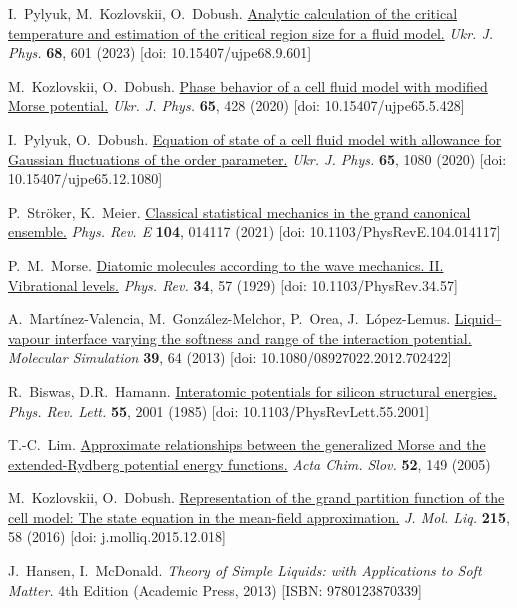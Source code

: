 \documentclass[fleqn,twoside,twocolumn,nofootinbib,showkeys]{revtex4} %
\begin{document}
\begin{thebibliography}{9}
		 I.~Pylyuk, M.~Kozlovskii, O.~Dobush.
		\href{https://ujp.bitp.kiev.ua/index.php/ujp/article/view/2023197}{Analytic calculation of the critical temperature and estimation of the critical region size for a fluid model.} \textit{Ukr. J. Phys.} \textbf{68}, 601 (2023) [doi: 10.15407/ujpe68.9.601]
		
		 M.~Kozlovskii, O.~Dobush.
		\href{https://ujp.bitp.kiev.ua/index.php/ujp/article/view/2019631}{Phase behavior of a cell fluid model with modified Morse potential.} \textit{Ukr. J. Phys.} \textbf{65}, 428 (2020) [doi: 10.15407/ujpe65.5.428]
		
		 I.~Pylyuk, O.~Dobush. \href{https://ujp.bitp.kiev.ua/index.php/ujp/article/view/2020185}{Equation of state of a cell fluid model with allowance for Gaussian fluctuations of the order parameter.} \textit{Ukr. J. Phys.} \textbf{65}, 1080 (2020) [doi: 10.15407/ujpe65.12.1080]
		
		 P.~Str\"oker, K.~Meier.
		\href{https://link.aps.org/doi/10.1103/PhysRevE.104.014117}{Classical
			statistical mechanics in the grand canonical ensemble.} \textit{Phys. Rev. E} \textbf{104}, 014117 (2021) [doi: 10.1103/PhysRevE.104.014117]
		
			P.~M.~Morse. \href{https://link.aps.org/doi/10.1103/PhysRev.34.57}{Diatomic
			molecules according to the wave mechanics. II. Vibrational levels.} \textit{Phys.
			Rev.} \textbf{34}, 57 (1929) [doi: 10.1103/PhysRev.34.57]
		
		 A.~Martínez-Valencia, M.~González-Melchor, P.~Orea, J.~López-Lemus.
		\href{https://doi.org/10.1080/08927022.2012.702422}{Liquid–vapour interface
			varying the softness and range of the interaction potential.} \textit{Molecular
			Simulation} \textbf{39}, 64 (2013) [doi: 10.1080/08927022.2012.702422]
		
		 R.~Biswas, D.R.~Hamann.
		\href{https://link.aps.org/doi/10.1103/PhysRevLett.55.2001}{Interatomic
			potentials for silicon structural energies.} \textit{Phys. Rev. Lett.} \textbf{55}, 2001 (1985) [doi: 10.1103/PhysRevLett.55.2001]
		
		 T.-C.~Lim. \href{https://acta-arhiv.chem-soc.si/52/52-2-149.htm}{Approximate
			relationships between the generalized Morse and the extended-Rydberg potential energy functions.} \textit{Acta Chim. Slov.} \textbf{52}, 149 (2005)
		
		 M.~Kozlovskii, O.~Dobush.
		\href{https://www.sciencedirect.com/science/article/pii/S0167732215312101}{Representation of the grand partition function of the cell model: The state equation in the mean-field approximation.} \textit{J. Mol. Liq.} \textbf{215}, 58 (2016) [doi: j.molliq.2015.12.018]
		
		 J.~Hansen, I.~McDonald. \textit{Theory of Simple Liquids: with Applications to Soft Matter.} 4th Edition (Academic Press, 2013) [ISBN: 9780123870339]
		
		
	\end{thebibliography}
	
\end{document}

